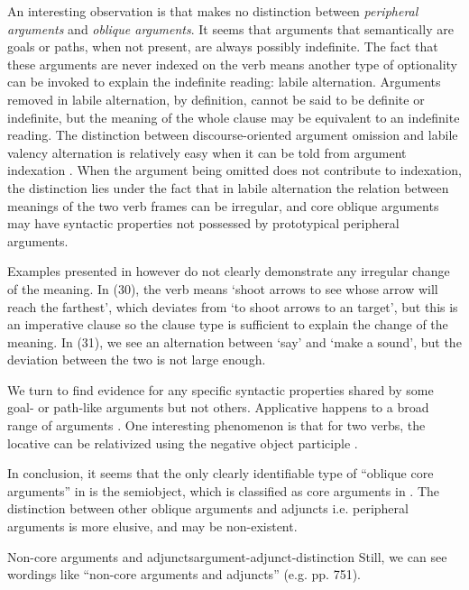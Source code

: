 \documentclass[a4paper, oneside, 12pt]{report}
\newcommand*{\citesec}[1]{\S~{#1}}
\newcommand*{\citepage}[1]{p.~{#1}}
\newcommand{\translate}[1]{`#1'}
\begin{document}
An interesting observation is that \citet[\citesec{22.1.2.2}]{jacques2021grammar}
makes no distinction between \emph{peripheral arguments} and
\emph{oblique arguments}.
It seems that arguments that semantically are goals or paths,
when not present, are always possibly indefinite.
The fact that these arguments are never indexed on the verb
means another type of optionality can be invoked to explain
the indefinite reading: labile alternation. 
Arguments removed in labile alternation, by definition,
cannot be said to be definite or indefinite,
but the meaning of the whole clause may be equivalent to an indefinite reading.
The distinction between discourse-oriented argument omission and labile valency alternation 
is relatively easy when it can be told from argument indexation
\citep[\citesec{22.1.2.1}]{jacques2021grammar}.
When the argument being omitted does not contribute to indexation,
the distinction lies under the fact that in labile alternation
the relation between meanings of the two verb frames can be irregular,
and core oblique arguments may have syntactic properties 
not possessed by prototypical peripheral arguments. 

Examples presented in \citet[\citesec{22.1.2.2}]{jacques2021grammar}
however do not clearly demonstrate any irregular change of the meaning.
In (30), the verb means \translate{shoot arrows to see whose arrow will reach the farthest},
which deviates from \translate{to shoot arrows to an target},
but this is an imperative clause so the clause type is sufficient to explain the change of the meaning.
In (31), we see an alternation between
\translate{say} and \translate{make a sound},
but the deviation between the two is not large enough. 

We turn to find evidence for any specific syntactic properties
shared by some goal- or path-like arguments but not others.
Applicative happens to a broad range of arguments 
\citep[\citepage{859}]{jacques2021grammar}.
One interesting phenomenon is that for two verbs,
the locative can be relativized using the negative object participle 
\citep[\citesec{23.5.5.2}]{jacques2021grammar}.

In conclusion, it seems that the only clearly identifiable type of ``oblique core arguments'' 
in 
is the semiobject,
which is classified as core arguments in \citet{jacques2021grammar}.
The distinction between other oblique arguments and adjuncts i.e. peripheral arguments
is more elusive, and may be non-existent.

\begin{todobox}{Non-core arguments and adjuncts}{argument-adjunct-distinction}
Still, we can see wordings like ``non-core arguments and adjuncts''
(e.g. pp. 751).
\end{todobox}
\end{document}
